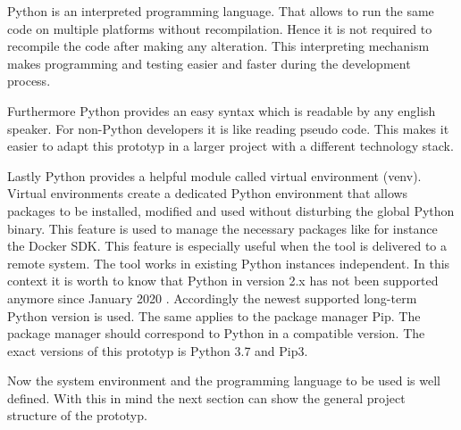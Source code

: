 Python is an interpreted programming language. That allows to run the same code on multiple platforms without recompilation. Hence it is not required to recompile the code after making any alteration. This interpreting mechanism makes programming and testing easier and faster during the development process.

Furthermore Python provides an easy syntax which is readable by any english speaker. For non-Python developers it is like reading pseudo code. This makes it easier to adapt this prototyp in a larger project with a different technology stack.

Lastly Python provides a helpful module called virtual environment (venv). Virtual environments create a dedicated Python environment that allows packages to be installed, modified and used without disturbing the global Python binary. This feature is used to manage the necessary packages like for instance the Docker SDK. This feature is especially useful when the tool is delivered to a remote system. The tool works in existing Python instances independent. In this context it is worth to know that Python in version 2.x has not been supported anymore since January 2020 \cite{python_deprecated}. Accordingly the newest supported long-term Python version is used. The same applies to the package manager Pip. The package manager should correspond to Python in a compatible version. 
The exact versions of this prototyp is Python 3.7 and Pip3.

Now the system environment and the programming language to be used is well defined. With this in mind the next section can show the general project structure of the prototyp.